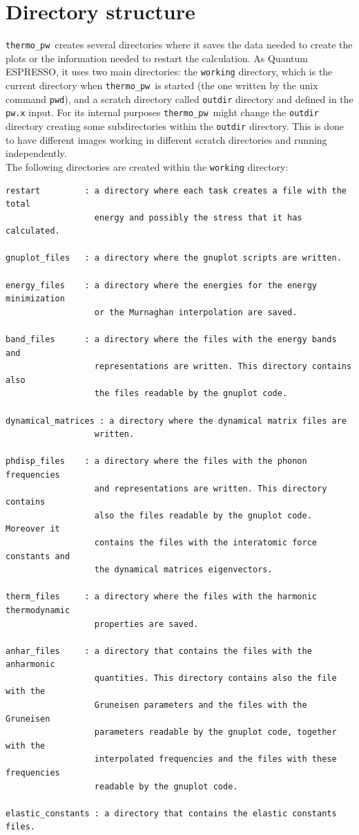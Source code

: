 \documentclass[12pt,a4paper]{article}
\def\qe{{\sc Quantum ESPRESSO}}
\def\thermo{{\texttt{thermo\_pw}}}
\begin{document}
\newpage
\section{\color{coral}Directory structure}
\thermo\ creates several directories where it saves the data needed to
create the plots or the information needed to restart the calculation.  
As \qe, it uses two main directories: the \texttt{working} 
directory, which is the current directory when \thermo\ is started 
(the one written by the unix command \texttt{pwd}), and a scratch directory 
called \texttt{outdir} directory and defined in the \texttt{pw.x} input. For its
internal purposes \thermo\ might change the \texttt{outdir} directory creating
some subdirectories within the \texttt{outdir} directory. This is done to
have different images working in different scratch directories and running
independently. \\
The following directories are created within the \texttt{working} directory:
\begin{verbatim}
restart         : a directory where each task creates a file with the total
                  energy and possibly the stress that it has calculated.

gnuplot_files   : a directory where the gnuplot scripts are written.

energy_files    : a directory where the energies for the energy minimization
                  or the Murnaghan interpolation are saved.

band_files      : a directory where the files with the energy bands and 
                  representations are written. This directory contains also
                  the files readable by the gnuplot code.

dynamical_matrices : a directory where the dynamical matrix files are
                  written.

phdisp_files    : a directory where the files with the phonon frequencies
                  and representations are written. This directory contains
                  also the files readable by the gnuplot code. Moreover it
                  contains the files with the interatomic force constants and
                  the dynamical matrices eigenvectors.

therm_files     : a directory where the files with the harmonic thermodynamic
                  properties are saved.

anhar_files     : a directory that contains the files with the anharmonic
                  quantities. This directory contains also the file with the
                  Gruneisen parameters and the files with the Gruneisen
                  parameters readable by the gnuplot code, together with the 
                  interpolated frequencies and the files with these frequencies
                  readable by the gnuplot code.

elastic_constants : a directory that contains the elastic constants files.
\end{verbatim}
\end{document}
